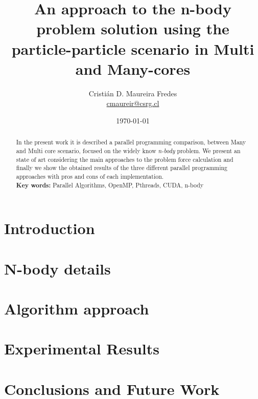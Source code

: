\documentclass[letter, 10pt]{IEEEtran}
\begin{document}
\pagestyle{empty}

\title{An approach to the n-body problem solution using the particle-particle scenario in Multi and Many-cores}
\author{Cristián D. Maureira Fredes\\\url{cmaureir@csrg.cl}}
\date{\today}

\maketitle
\begin{abstract}
In the present work it is described a parallel programming
comparison, between Many and Multi core scenario,
focused on the widely know \emph{n-body} problem.
We present an state of art considering the main approaches to
the problem force calculation and finally
we show the obtained results of the three different
parallel programming approaches with pros and cons
of each implementation.
\\
\textbf{Key words:} Parallel Algorithms, OpenMP, Pthreads, CUDA, n-body

\end{abstract}

\section{Introduction}
\label{introduction}



\section{N-body details}
\label{nbody-details}



\section{Algorithm approach}
\label{algorithm}



\section{Experimental Results}
\label{experimental}


\section{Conclusions and Future Work}
\label{conclusions}




\end{document}
